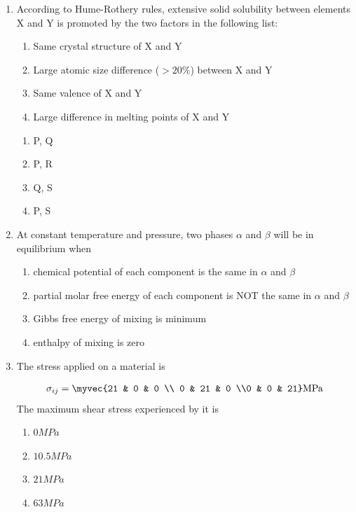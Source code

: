 \documentclass[journal]{IEEEtran}
\theoremstyle{remark}
\begin{document}
\begin{enumerate}
\item According to Hume-Rothery rules, extensive solid solubility between elements X and Y is promoted by 
the two factors in the following list:\hfill{}
\begin{enumerate}[label=\Alph*), start=16]
    \item Same crystal structure of X and Y
    \item Large atomic size difference ($>20\%$) between X and Y
    \item Same valence of X and Y
    \item Large difference in melting points of X and Y
\end{enumerate}
\begin{multicols}{4}
\begin{enumerate}
\item  P, Q
\item  P, R
\item Q, S
\item P, S
\end{enumerate}
\end{multicols}

\item At constant temperature and pressure, two phases $\alpha$ and $\beta$ will be in equilibrium when\hfill{}\\
\begin{enumerate}
\item chemical potential of each component is the same in $\alpha$  and $\beta$
\item partial molar free energy of each component is NOT the same in $\alpha$  and $\beta$
\item Gibbs free energy of mixing is minimum
\item  enthalpy of mixing is zero
\end{enumerate}

	\item  The stress applied on a material is
    \hfill{}
    
\begin{align}
\sigma_{ij}= 
\myvec{21 & 0 & 0 \\ 0 & 21 & 0 \\0 & 0 & 21} \text{MPa}
\end{align}
The maximum shear stress experienced by it is
\begin{multicols}{4}
\begin{enumerate}
\item  $0 MPa$
\item  $10.5 MPa$
\item  $21 MPa$
\item  $63 MPa$
\end{enumerate}
\end{multicols}


\end{enumerate}
\end{document}
